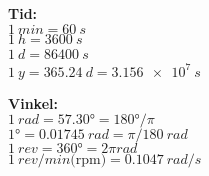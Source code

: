 \noindent\textbf{Tid:} \\
  $\qty{1}{min} = \qty{60}{s}$ \\
  $\qty{1}{h} = \qty{3600}{s}$ \\
  $\qty{1}{d} = \qty{86400}{s}$ \\
  $\qty{1}{y} = \qty{365,24}{d} = \qty{3,156e7}{s}$

  \vspace{12pt}

\noindent\textbf{Vinkel:} \\
  $\qty{1}{rad} = \ang{57,30} = \ang{180} / \pi$ \\
  $\ang{1} = \qty{0,01745}{rad} = \pi / \qty{180}{rad}$ \\
  $\qty{1}{rev} = \ang{360} = 2\pi \unit{rad}$ \\
  $\qty{1}{rev/min} \text{(rpm)} = \qty{0,1047}{rad / s}$
